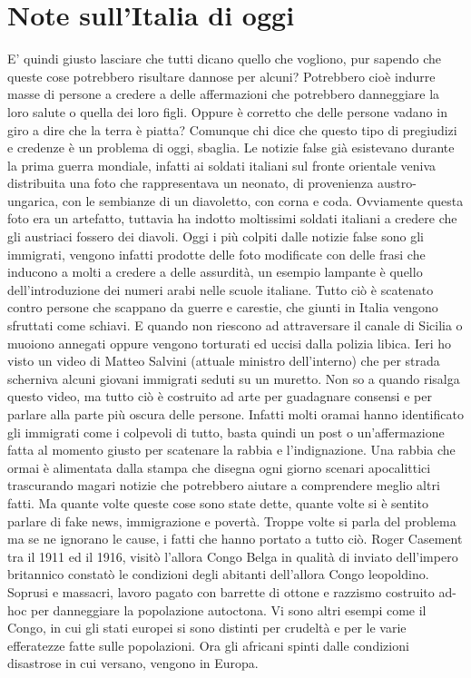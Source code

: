 \section{Note sull'Italia di oggi}
E' quindi giusto lasciare che tutti dicano quello che vogliono, pur sapendo che queste cose potrebbero risultare dannose per alcuni? Potrebbero cioè indurre masse di persone a credere a delle affermazioni che potrebbero danneggiare la loro salute o quella dei loro figli.\newline
Oppure è corretto che delle persone vadano in giro a dire che la terra è piatta?\newline
Comunque chi dice che questo tipo di pregiudizi e credenze è un problema di oggi, sbaglia. Le notizie false già esistevano durante la prima guerra mondiale, infatti ai soldati italiani sul fronte orientale veniva distribuita una foto che rappresentava un neonato, di provenienza austro-ungarica, con le sembianze di un diavoletto, con corna e coda. Ovviamente questa foto era un artefatto, tuttavia ha indotto moltissimi soldati italiani a credere che gli austriaci fossero dei diavoli. Oggi i più colpiti dalle notizie false sono gli immigrati, vengono infatti prodotte delle foto modificate con delle frasi che inducono a molti a credere a delle assurdità, un esempio lampante è quello dell'introduzione dei numeri arabi nelle scuole italiane. Tutto ciò è scatenato contro persone che scappano da guerre e carestie, che giunti in Italia vengono sfruttati come schiavi. E quando non riescono ad attraversare il canale di Sicilia o muoiono annegati oppure vengono torturati ed uccisi dalla polizia libica.
Ieri ho visto un video di Matteo Salvini (attuale ministro dell'interno) che per strada scherniva alcuni giovani immigrati seduti su un muretto. Non so a quando risalga questo video, ma tutto ciò è costruito ad arte per guadagnare consensi e per parlare alla parte più oscura delle persone. Infatti molti oramai hanno identificato gli immigrati come i colpevoli di tutto, basta quindi un post o un'affermazione fatta al momento giusto per scatenare la rabbia e l'indignazione. Una rabbia che ormai è alimentata dalla stampa che disegna ogni giorno scenari apocalittici trascurando magari notizie che potrebbero aiutare a comprendere meglio altri fatti.\newline
Ma quante volte queste cose sono state dette, quante volte si è sentito parlare di fake news, immigrazione e povertà. Troppe volte si parla del problema ma se ne ignorano le cause, i fatti che hanno portato a tutto ciò.
Roger Casement tra il 1911 ed il 1916, visitò l'allora Congo Belga in qualità di inviato dell'impero britannico constatò le condizioni degli abitanti dell'allora Congo leopoldino. Soprusi e massacri, lavoro pagato con barrette di ottone e razzismo costruito ad-hoc per danneggiare la popolazione autoctona. \newline
Vi sono altri esempi come il Congo, in cui gli stati europei si sono distinti per crudeltà e per le varie efferatezze fatte sulle popolazioni. Ora gli africani spinti dalle condizioni disastrose in cui versano, vengono in Europa. 
